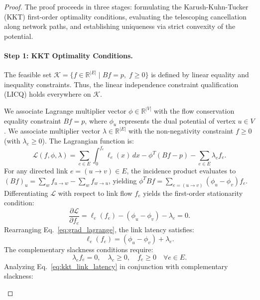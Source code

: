 \documentclass[11pt,a4paper]{article}
\begin{document}
\begin{proof}
The proof proceeds in three stages: formulating the Karush-Kuhn-Tucker (KKT) first-order optimality conditions, evaluating the telescoping cancellation along network paths, and establishing uniqueness via strict convexity of the potential.

\paragraph{Step 1: KKT Optimality Conditions.}
The feasible set $\mathcal{K} = \{f \in \mathbb{R}^{|E|} \mid B f = p, \; f \ge 0\}$ is defined by linear equality and inequality constraints. Thus, the linear independence constraint qualification (LICQ) holds everywhere on $\mathcal{K}$.

We associate Lagrange multiplier vector $\phi \in \mathbb{R}^{|V|}$ with the flow conservation equality constraint $B f = p$, where $\phi_u$ represents the dual potential of vertex $u \in V$. We associate multiplier vector $\lambda \in \mathbb{R}^{|E|}$ with the non-negativity constraint $f \ge 0$ (with $\lambda_e \ge 0$). The Lagrangian function is:
\begin{equation}
\mathcal{L}(f, \phi, \lambda) = \sum_{e \in E} \int_0^{f_e} \ell_e(x) \, dx - \phi^T (B f - p) - \sum_{e \in E} \lambda_e f_e.
\end{equation}
For any directed link $e = (u \to v) \in E$, the incidence product evaluates to $(B f)_u = \sum_{w} f_{u \to w} - \sum_{w} f_{w \to u}$, yielding $\phi^T B f = \sum_{e=(u \to v)} (\phi_u - \phi_v) f_e$. Differentiating $\mathcal{L}$ with respect to link flow $f_e$ yields the first-order stationarity condition:
\begin{equation}
\label{eq:grad_lagrange}
\frac{\partial \mathcal{L}}{\partial f_e} = \ell_e(f_e) - (\phi_u - \phi_v) - \lambda_e = 0.
\end{equation}
Rearranging Eq.~\eqref{eq:grad_lagrange}, the link latency satisfies:
\begin{equation}
\label{eq:kkt_link_latency}
\ell_e(f_e) = (\phi_u - \phi_v) + \lambda_e.
\end{equation}
The complementary slackness conditions require:
\begin{equation}
\label{eq:complementary_slackness}
\lambda_e f_e = 0, \quad \lambda_e \ge 0, \quad f_e \ge 0 \quad \forall e \in E.
\end{equation}
Analyzing Eq.~\eqref{eq:kkt_link_latency} in conjunction with complementary slackness:
\begin{itemize}

\end{itemize}
\end{proof}
\end{document}
